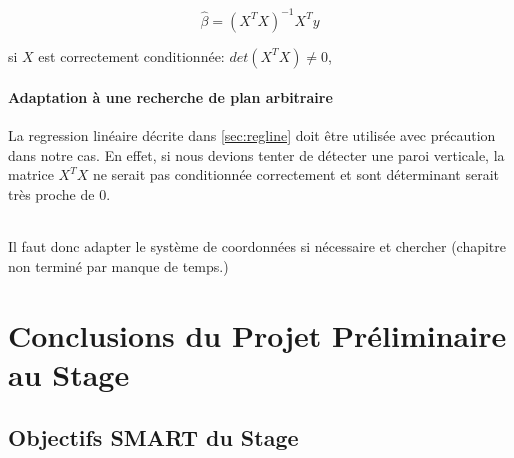 \documentclass[12pt,a4paper]{report}
\begin{document}
\begin{equation}
\boxed{
	\hat{\beta}=(X^TX)^{-1}X^Ty
}
\end{equation}

si $X$ est correctement conditionnée: $det(X^TX) \neq 0$, 

\subsection{Adaptation à une recherche de plan arbitraire}

La regression linéaire décrite dans \ref{sec:regline} doit être utilisée avec précaution dans notre cas. En effet, si nous devions tenter de détecter une paroi verticale, la matrice $ X^TX$ ne serait pas conditionnée correctement et sont déterminant serait très proche de $0$.

\paragraph{} Il faut donc adapter le système de coordonnées si nécessaire et chercher (chapitre non terminé par manque de temps.)

\part{Conclusions du Projet Préliminaire au Stage}
  
\chapter{Objectifs SMART du Stage}
\end{document}
